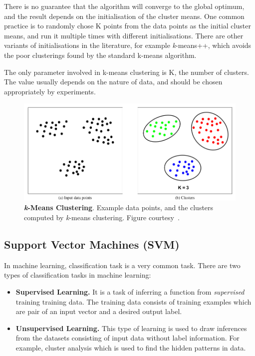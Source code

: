 There is no guarantee that the algorithm will converge to the global optimum, and the result depends
on the initialisation of the cluster means. One common practice is to randomly chose K points from
the data points as the initial cluster means, and run it multiple times with different initialisations. There
are other variants of initialisations in the literature, for example \textit{k}-means++, which avoids the poor
clusterings found by the standard k-means algorithm. 

The only parameter involved in k-means clustering is K, the number of clusters. The value usually depends on the nature of data, and should be chosen appropriately by experiments.


\begin{figure}
\centering
\includegraphics[scale=0.4]{figures/kmeansClust.png}
\caption{\textbf{\textit{k}-Means Clustering}. Example data points, and the clusters computed by \textit{k}-means clustering. Figure courtesy~\cite{junejaThesis}.}
\label{fig:kmeansPic}
\end{figure}

\subsection{Support Vector Machines (\textsc{SVM})}
In machine learning, classification task is a very common task. There are two types of classification tasks in machine learning:
\begin{itemize}
\item \textbf{Supervised Learning.} It is a task of inferring a function from \textit{supervised} training training data. The training data consists of training examples which are pair of an input vector and a desired output label.
\item \textbf{Unsupervised Learning.} This type of learning is used to draw inferences from the datasets consisting of input data without label information. For example, cluster analysis which is used to find the hidden patterns in data.
\end{itemize}

